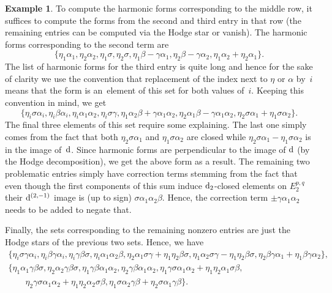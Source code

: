 \documentclass[pdftex]{sigma}
\numberwithin{equation}{section}
\theoremstyle{definition}
\newtheorem{egg}[tw]{Example}
\begin{document}
\begin{egg}
 To compute the harmonic forms corresponding to the middle row, it suffices to compute the forms from the second and third entry in that row (the remaining entries can be computed via the Hodge star or vanish). The harmonic forms corresponding to the second term are
\[\{\eta_1\alpha_1,\eta_2\alpha_2,\eta_1\sigma,\eta_2\sigma,\eta_1\beta-\gamma\alpha_1, \eta_2\beta-\gamma\alpha_2,\eta_1\alpha_2+\eta_2\alpha_1\}.\]
The list of harmonic forms for the third entry is quite long and hence for the sake of clarity we use the convention that replacement of the index next to $\eta$ or $\alpha$ by~$i$ means that the form is an~element of this set for both values of~$i$. Keeping this convention in mind, we get
\[\{\eta_i\sigma\alpha_i,\eta_i\beta\alpha_i,\eta_i\alpha_1\alpha_2, \eta_i\sigma\gamma,\eta_1\alpha_2\beta+\gamma\alpha_1\alpha_2,\eta_2\alpha_1\beta-\gamma\alpha_1\alpha_2, \eta_2\sigma\alpha_1+\eta_1\sigma\alpha_2\}.\]
The final three elements of this set require some explaining. The last one simply comes from the fact that both $\eta_2\sigma\alpha_1$ and $\eta_1\sigma\alpha_2$ are closed while $\eta_2\sigma\alpha_1-\eta_1\sigma\alpha_2$ is in the image of~${\rm d}$. Since harmonic forms are perpendicular to the image of ${\rm d}$ (by the Hodge decomposition), we get the above form as a result. The remaining two problematic entries simply have correction terms stemming from the fact that even though the first components of this sum induce ${\rm d}_2$-closed elements on $E^{p,q}_2$ their ${\rm d}^{(2,-1)}$ image is (up to sign) $\sigma\alpha_1\alpha_2\beta$. Hence, the correction term $\pm\gamma\alpha_1\alpha_2$ needs to be added to negate that.

 Finally, the sets corresponding to the remaining nonzero entries are just the Hodge stars of the previous two sets. Hence, we have
\begin{gather*}
\{\eta_i\sigma\gamma\alpha_i,\eta_i\beta\gamma\alpha_i,\eta_i\gamma\beta\sigma,\eta_i\alpha_1\alpha_2\beta, \eta_2\alpha_1\sigma\gamma+\eta_1\eta_2\beta\sigma,\eta_1\alpha_2\sigma\gamma-\eta_1\eta_2\beta\sigma,\eta_2\beta\gamma\alpha_1+\eta_1\beta\gamma\alpha_2\},\\
\{\eta_1\alpha_1\gamma\beta\sigma,\eta_2\alpha_2\gamma\beta\sigma,\eta_1\gamma\beta\alpha_1\alpha_2,\eta_2\gamma\beta\alpha_1\alpha_2, \eta_1\gamma\sigma\alpha_1\alpha_2+\eta_1\eta_2\alpha_1\sigma\beta,\\
\qquad{}\eta_2\gamma\sigma\alpha_1\alpha_2+\eta_1\eta_2\alpha_2\sigma\beta, \eta_1\sigma\alpha_2\gamma\beta+\eta_2\sigma\alpha_1\gamma\beta\}.
\end{gather*}
\end{egg}
\end{document}
